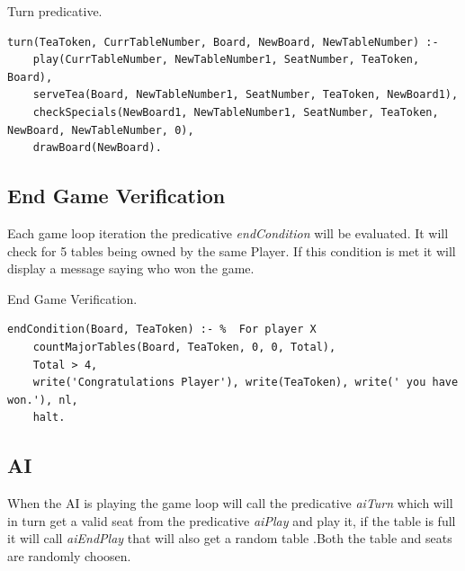 \documentclass[a4paper]{article}
\begin{document}
    \begin{listing}[H]
            \caption{Turn predicative.}
            \label{Codigo:cod_turn}
            \begin{verbatim}
turn(TeaToken, CurrTableNumber, Board, NewBoard, NewTableNumber) :-
    play(CurrTableNumber, NewTableNumber1, SeatNumber, TeaToken, Board),
    serveTea(Board, NewTableNumber1, SeatNumber, TeaToken, NewBoard1),
    checkSpecials(NewBoard1, NewTableNumber1, SeatNumber, TeaToken, NewBoard, NewTableNumber, 0),
    drawBoard(NewBoard).

    \end{verbatim}

    \end{listing}


\subsection{End Game Verification}
 Each game loop iteration the predicative \textit{endCondition} will be evaluated. It will check for 5 tables being owned by the same Player. If this condition is met it will
  display a message saying who won the game.

\renewcommand\listingscaption{Code}

\begin{listing}[H]
    \caption{End Game Verification.}
    \label{Codigo:cod_end}
    \begin{verbatim}
endCondition(Board, TeaToken) :- %  For player X
    countMajorTables(Board, TeaToken, 0, 0, Total),
    Total > 4,
    write('Congratulations Player'), write(TeaToken), write(' you have won.'), nl,
    halt.

\end{verbatim}

\end{listing}

\subsection{AI}
    When the AI is playing the game loop will call the predicative \textit{aiTurn} which will in turn get a valid seat
    from the predicative \textit{aiPlay} and play it, if the table is full it will call \textit{aiEndPlay} that will also get a random table
    .Both the table and seats are randomly choosen.
\end{document}
